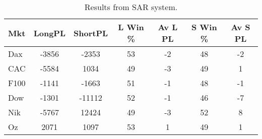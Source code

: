 \begin{table}[ht]
\centering
\caption[SAR Base System]{Results from SAR system.} 
\label{tab:sar_results}
\begin{tabular}{lcccccc}
  \toprule Mkt & LongPL & ShortPL & L Win \% & Av L PL & S Win \% & Av S PL \\ 
  \midrule Dax & -3856 & -2353 & 53 & -2 & 48 & -2 \\ 
  CAC & -5584 & 1034 & 49 & -3 & 49 & 1 \\ 
  F100 & -1141 & -1663 & 51 & -1 & 48 & -1 \\ 
  Dow & -1301 & -11112 & 52 & -1 & 46 & -7 \\ 
  Nik & -5767 & 12424 & 49 & -3 & 52 & 8 \\ 
  Oz & 2071 & 1097 & 53 & 1 & 49 & 1 \\ 
   \bottomrule \end{tabular}
\end{table}
